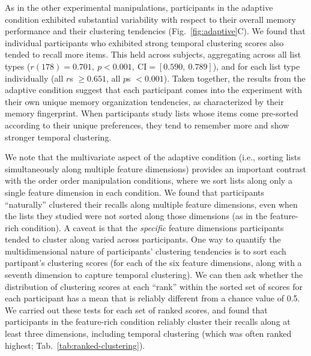 \documentclass[11pt]{article}
\newcommand{\abbreviations}{S1}
\begin{document}
As in the other experimental manipulations, participants in the adaptive
condition exhibited substantial variability with respect to their overall
memory performance and their clustering tendencies (Fig.~\ref{fig:adaptive}C).
We found that individual participants who exhibited strong temporal clustering
scores also tended to recall more items. This held across subjects, aggregating
across all list types ($r(178) = 0.701,~p < 0.001,~\mathrm{CI} = [0.590,~
0.789]$), and for each list type individually (all $r$s $\geq 0.651$, all $p$s
$< 0.001$). Taken together, the results from the adaptive condition suggest
that each participant comes into the experiment with their own unique memory
organization tendencies, as characterized by their memory fingerprint. When
participants study lists whose items come pre-sorted according to their unique
preferences, they tend to remember more and show stronger temporal clustering.

\begin{table}[tp]
\centering
\tiny


\caption{\textbf{Ranked clustering scores versus ``chance'' for participants in
the feature-rich condition.} For each participant, we sorted their clustering
scores in descending order (for each of the six feature dimensions, along with
a seventh dimension to capture temporal clustering). The $t$-tests reported in
the table (for the clustering scores at each ``rank'') were carried out
across-participants, and reflect data aggregated across all lists from each
participant. Abbreviations used in this table are defined in
Table~\abbreviations.}

\label{tab:ranked-clustering}
\end{table}

We note that the multivariate aspect of the adaptive condition (i.e., sorting
lists simultaneously along multiple feature dimensions) provides an important
contrast with the order order manipulation conditions, where we sort lists
along only a single feature dimension in each condition. We found that
participants ``naturally'' clustered their recalls along multiple feature
dimensions, even when the lists they studied were not sorted along those
dimensions (as in the feature-rich condition). A caveat is that the
\textit{specific} feature dimensions participants tended to cluster along
varied across participants. One way to quantify the multidimensional nature of
participants' clustering tendencies is to sort each partipant's clustering
scores (for each of the six feature dimensions, along with a seventh dimension
to capture temporal clustering). We can then ask whether the distribution of
clustering scores at each ``rank'' within the sorted set of scores for each
participant has a mean that is reliably different from a chance value of 0.5.
We carried out these tests for each set of ranked scores, and found that
participants in the feature-rich condition reliably cluster their recalls along
at least three dimensions, including temporal clustering (which was often
ranked highest; Tab.~\ref{tab:ranked-clustering}).
\end{document}
